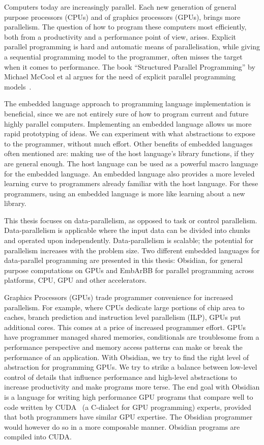 \documentclass[a4paper]{book}
\begin{document}
Computers today are increasingly parallel. Each new generation of general purpose processors
(CPUs) and of graphics processors (GPUs), brings more parallelism. The question 
of how to program these computers most efficiently, both from a productivity and 
a performance point of view, arises. Explicit parallel programming is hard and automatic 
means of parallelisation, while giving a sequential programming model to the programmer, 
often misses the target when it comes to performance. The book ``Structured Parallel 
Programming'' by Michael McCool et al argues for the need of explicit parallel programming 
models~\citet{STRUCTURED}.

The embedded language approach to programming language implementation is beneficial, 
since we are not entirely sure of how to program current and future highly parallel 
computers. Implementing an embedded language allows us more rapid prototyping of ideas. 
We can experiment with what abstractions to expose to the programmer, without much 
effort. Other benefits of embedded languages often mentioned are: making use 
of the host language's library functions, if they are general enough. The host language 
can be used as a powerful macro language for the embedded language. An embedded 
language also provides a more leveled learning curve to programmers already familiar 
with the host language. For these programmers, using an embedded language is more like  
learning about a new library. 

This thesis focuses on data-parallelism, as opposed to task or control parallelism.
Data-parallelism is applicable where the input data can be divided into chunks
and operated upon independently. Data-parallelism is scalable; the potential 
for parallelism increases with the problem size. Two different embedded languages 
for data-parallel programming are presented in this thesis: Obsidian, for 
general purpose computations on GPUs and EmbArBB for parallel programming across 
platforms, CPU, GPU and other accelerators. 

Graphics Processors (GPUs) trade programmer convenience for increased parallelism. 
For example, where CPUs dedicate large portions of chip area to caches, branch 
prediction and instruction level parallelism (ILP), GPUs put additional cores. 
This comes at a price of increased programmer effort. GPUs have programmer managed 
shared memories, conditionals are troublesome from a performance 
perspective and memory access patterns can make or break the performance of an 
application. With Obsidian, we try to find the right level of abstraction for 
programming GPUs. We try to strike a balance between low-level control of details 
that influence performance and high-level abstractions to increase productivity and 
make programs more terse. The end goal with Obsidian is a language for writing 
high performance GPU programs that compare well to code written by CUDA~\citet{CUDA}  
(a C-dialect for GPU programming) experts, provided that both programmers have 
similar GPU expertise. The Obsidian programmer would however do so in a more 
composable manner. Obsidian programs are compiled into CUDA.  
\end{document}
